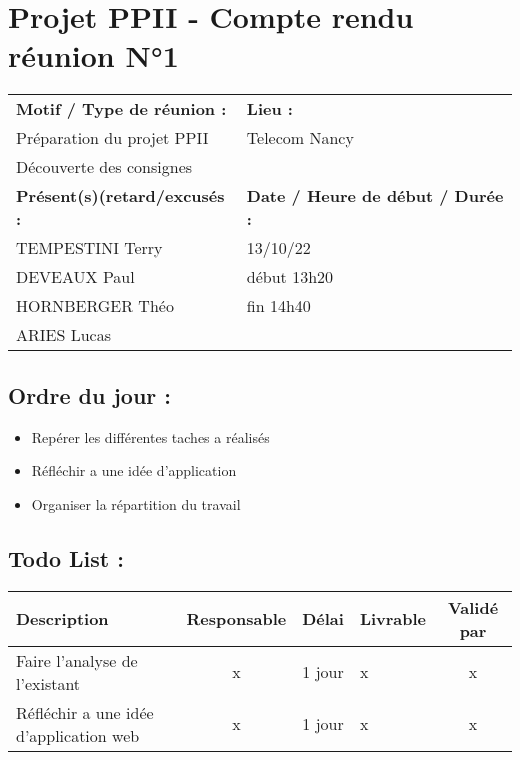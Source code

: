 \documentclass{article}
\begin{document}
\section*{Projet PPII - Compte rendu réunion N°1}
\begin{tabular}{|p{7cm}|p{6cm}|}
    \hline
    \textbf{Motif / Type de réunion :}
    & \textbf{Lieu :}
    \\
    Préparation du projet PPII
    & 
    Telecom Nancy
    \\ 
    Découverte des consignes &
    \\\hline
    \textbf{Présent(s)(retard/excusés :}
    &
    \textbf{Date / Heure de début / Durée :}
    \\ 
    TEMPESTINI Terry &  13/10/22\\  
    DEVEAUX Paul & début 13h20\\
    HORNBERGER Théo & fin 14h40\\
    ARIES Lucas & 
    \\ \hline
\end{tabular}

\subsection*{Ordre du jour :}
\begin{itemize}
    \item{Repérer les différentes taches a réalisés}
    \item{Réfléchir a une idée d’application}
    \item{Organiser la répartition du travail}
\end{itemize}

\subsection*{Todo List :}
\begin{tabular}{|p{3.5cm}|c|c|p{4.5cm}|c|}
    \hline 
    Description & Responsable & Délai & Livrable & Validé par 
    \\ \hline
    Faire l’analyse de l’existant & x & 1 jour & x & x
    \\ \hline
    Réfléchir a une idée d’application web & x & 1 jour & x & x
    \\ \hline
\end{tabular}
\end{document}
